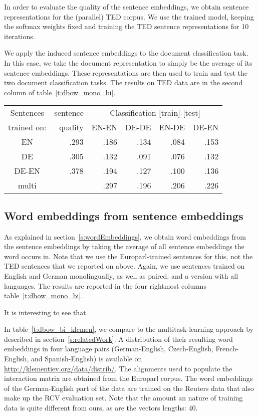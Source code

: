  In order to evaluate the quality of the sentence embeddings, we obtain sentence representations for the (parallel) TED corpus. We use the trained model, keeping the softmax weights fixed and training the TED sentence representations for 10 iterations.

We apply the induced sentence embeddings to the document classification task. In this case, we take the document representation to simply be the average of its sentence embeddings. These representations are then used to train and test the two document classification tasks. The results on TED data are in the second column of table~\ref{t:dbow_mono_bi}.

\begin{table*}[t]
\center
\begin{tabular}{c | r|r r r r }
Sentences 		&sentence	&	\multicolumn{4}{c}{Classification [train]-[test]}	\\
trained on: 		&quality	&EN-EN	&DE-DE	&EN-DE	&DE-EN	\\\hline
EN			&.293		&.186		&.134		&.084		&.153		\\
DE			&.305		&.132		&.091		&.076		&.132		\\
DE-EN			&.378		&.194		&.127		&.100		&.136		\\
multi 			&		&.297		&.196		&.206		&.226		\\
\end{tabular}
\caption{F1 scores on TED classification task for sentence representations and word representations.}
\label{t:dbow_mono_bi}
\end{table*}



\subsection{Word embeddings from sentence embeddings}

As explained in section~\ref{s:wordEmbeddings}, we obtain word embeddings from the sentence embeddings by taking the average of all sentence embeddings the word occurs in. Note that we use the Europarl-trained sentences for this, not the TED sentences that we reported on above. Again, we use sentences trained on English and German monolingually, as well as paired, and a version with all languages. The results are reported in the four rightmost columns table~\ref{t:dbow_mono_bi}.

It is interesting to see that %


In table~\ref{t:dbow_bi_klemen}, we compare to the multitask-learning approach by \cite{klementiev2012inducing} described in section~\ref{s:relatedWork}. A distribution of their resulting word embeddings in four language pairs (German-English, Czech-English, French-English, and Spanish-English) is available on \url{http://klementiev.org/data/distrib/}. The alignments used to populate the interaction matrix are obtained from the Europarl corpus. The word embeddings of the German-English part of the data are trained on the Reuters data that also make up the RCV evaluation set. Note that the amount an nature of training data is quite different from ours, as are the vectors lengths: 40.



